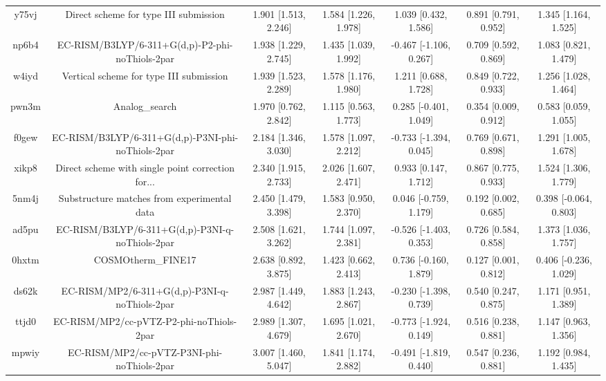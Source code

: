 \documentclass{article}
\begin{document}
\begin{center}
\begin{longtable}{|ccccccc|}
 y75vj &              Direct scheme for type III submission &  1.901 [1.513, 2.246] &  1.584 [1.226, 1.978] &     1.039 [0.432, 1.586] &  0.891 [0.791, 0.952] &   1.345 [1.164, 1.525] \\
 np6b4 &    EC-RISM/B3LYP/6-311+G(d,p)-P2-phi-noThiols-2par &  1.938 [1.229, 2.745] &  1.435 [1.039, 1.992] &   -0.467 [-1.106, 0.267] &  0.709 [0.592, 0.869] &   1.083 [0.821, 1.479] \\
 w4iyd &            Vertical scheme for type III submission &  1.939 [1.523, 2.289] &  1.578 [1.176, 1.980] &     1.211 [0.688, 1.728] &  0.849 [0.722, 0.933] &   1.256 [1.028, 1.464] \\
 pwn3m &                                     Analog\_search &  1.970 [0.762, 2.842] &  1.115 [0.563, 1.773] &    0.285 [-0.401, 1.049] &  0.354 [0.009, 0.912] &   0.583 [0.059, 1.055] \\
 f0gew &  EC-RISM/B3LYP/6-311+G(d,p)-P3NI-phi-noThiols-2par &  2.184 [1.346, 3.030] &  1.578 [1.097, 2.212] &   -0.733 [-1.394, 0.045] &  0.769 [0.671, 0.898] &   1.291 [1.005, 1.678] \\
 xikp8 &  Direct scheme with single point correction for... &  2.340 [1.915, 2.733] &  2.026 [1.607, 2.471] &     0.933 [0.147, 1.712] &  0.867 [0.775, 0.933] &   1.524 [1.306, 1.779] \\
 5nm4j &        Substructure matches from experimental data &  2.450 [1.479, 3.398] &  1.583 [0.950, 2.370] &    0.046 [-0.759, 1.179] &  0.192 [0.002, 0.685] &  0.398 [-0.064, 0.803] \\
 ad5pu &    EC-RISM/B3LYP/6-311+G(d,p)-P3NI-q-noThiols-2par &  2.508 [1.621, 3.262] &  1.744 [1.097, 2.381] &   -0.526 [-1.403, 0.353] &  0.726 [0.584, 0.858] &   1.373 [1.036, 1.757] \\
 0hxtm &                                 COSMOtherm\_FINE17 &  2.638 [0.892, 3.875] &  1.423 [0.662, 2.413] &    0.736 [-0.160, 1.879] &  0.127 [0.001, 0.812] &  0.406 [-0.236, 1.029] \\
 ds62k &      EC-RISM/MP2/6-311+G(d,p)-P3NI-q-noThiols-2par &  2.987 [1.449, 4.642] &  1.883 [1.243, 2.867] &   -0.230 [-1.398, 0.739] &  0.540 [0.247, 0.875] &   1.171 [0.951, 1.389] \\
 ttjd0 &           EC-RISM/MP2/cc-pVTZ-P2-phi-noThiols-2par &  2.989 [1.307, 4.679] &  1.695 [1.021, 2.670] &   -0.773 [-1.924, 0.149] &  0.516 [0.238, 0.881] &   1.147 [0.963, 1.356] \\
 mpwiy &         EC-RISM/MP2/cc-pVTZ-P3NI-phi-noThiols-2par &  3.007 [1.460, 5.047] &  1.841 [1.174, 2.882] &   -0.491 [-1.819, 0.440] &  0.547 [0.236, 0.881] &   1.192 [0.984, 1.435] \\

\end{longtable}
\end{center}
\end{document}
